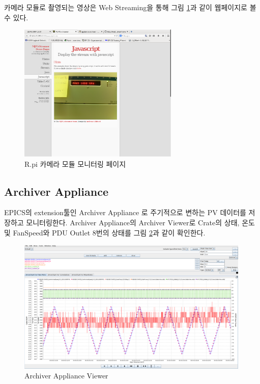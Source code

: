 \documentclass[11pt
  , a4paper
  , article
  , oneside
]{memoir}
\begin{document}
카메라 모듈로 촬영되는 영상은 Web Streaming을 통해 그림 \ref{fig:javapage}과 같이 웹페이지로 볼 수 있다. 

\begin{figure}[h!]
  \centering
  \includegraphics[width=0.68\textwidth]{./images/javapage.eps}
  \caption{R.pi 카메라 모듈 모니터링 페이지}
  \label{fig:javapage}   
\end{figure}

\subsection{Archiver Appliance}
EPICS의 extension툴인 Archiver Appliance 로 주기적으로 변하는 PV 데이터를 저장하고 모니터링한다. Archiver Appliance의 Archiver Viewer로 Crate의 상태, 온도 및 FanSpeed와 PDU Outlet 8번의 상태를 그림 \ref{fig:aaviewer}과 같이 확인한다.

\begin{figure}[h!]
  \centering
  \includegraphics[width=0.99\textwidth]{./images/aaviewer_3.eps}
  \caption{Archiver Appliance Viewer}
  \label{fig:aaviewer}   
\end{figure}
\end{document}
